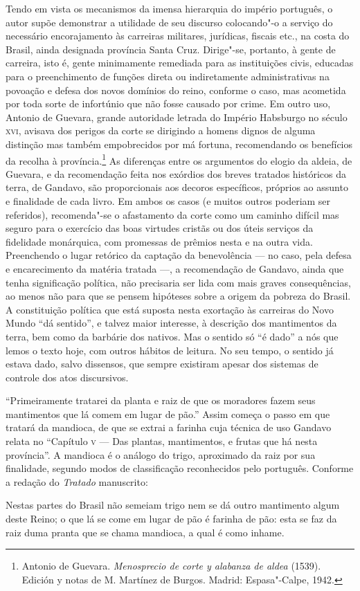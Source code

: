 Tendo em vista os mecanismos da imensa hierarquia do império português,
o autor supõe demonstrar a utilidade de seu discurso colocando"-o a
serviço do necessário encorajamento às carreiras militares, jurídicas,
fiscais etc., na costa do Brasil, ainda designada província Santa
Cruz. Dirige"-se, portanto, à gente de carreira, isto é, gente
minimamente remediada para as instituições civis, educadas para o
preenchimento de funções direta ou indiretamente administrativas na
povoação e defesa dos novos domínios do reino, conforme o caso, mas
acometida por toda sorte de infortúnio que não fosse causado por crime.
Em outro uso, Antonio de Guevara, grande autoridade letrada do Império
Habsburgo no século \textsc{xvi}, avisava dos perigos da corte se dirigindo a
homens dignos de alguma distinção mas também empobrecidos por má
fortuna, recomendando os benefícios da recolha à província.\footnote{ Antonio 
de Guevara. \textit{Menosprecio de corte y alabanza de aldea} (1539).
Edición y notas de M. Martínez de Burgos. Madrid: Espasa"-Calpe, 1942.}
As diferenças entre os argumentos do elogio da aldeia, de Guevara, e da
recomendação feita nos exórdios dos breves tratados históricos da
terra, de Gandavo, são proporcionais aos decoros específicos, próprios
ao assunto e finalidade de cada livro. Em ambos os casos (e muitos
outros poderiam ser referidos), recomenda"-se o afastamento da corte
como um caminho difícil mas seguro para o exercício das boas virtudes
cristãs ou dos úteis serviços da fidelidade monárquica, com promessas
de prêmios nesta e na outra vida. Preenchendo o lugar retórico da
captação da benevolência --- no caso, pela defesa  e encarecimento da
matéria tratada ---, a recomendação de Gandavo, ainda que tenha
significação política, não precisaria ser lida com mais graves
consequências, ao menos não para que se pensem hipóteses sobre a origem
da pobreza do Brasil. A constituição política que está suposta nesta
exortação às carreiras do Novo Mundo ``dá sentido'', e talvez maior interesse, 
à descrição dos mantimentos da terra, bem como da barbárie dos nativos. 
Mas o sentido só ``é dado'' a nós que lemos o texto hoje, com outros hábitos de leitura. 
No seu tempo, o sentido já estava dado, salvo dissensos, que sempre existiram 
apesar dos sistemas de controle dos atos discursivos. 

``Primeiramente tratarei da planta e raiz de que os
moradores fazem seus mantimentos que lá comem em lugar de
pão.'' Assim começa o passo em que tratará da mandioca, de
que se extrai a farinha cuja técnica de uso Gandavo relata no
``Capítulo \textsc{v} --- Das plantas, mantimentos, e frutas que há
nesta província''. A mandioca é o análogo do trigo,
aproximado da raiz por sua finalidade, segundo modos de classificação
reconhecidos pelo português. Conforme a redação do \textit{Tratado} manuscrito:
\begin{hedraquote}
Nestas partes do Brasil não semeiam trigo nem se dá outro mantimento algum
deste Reino; o que lá se come em lugar de pão é farinha de pão: esta
se faz da raiz duma pranta que se chama mandioca, a qual é como inhame.
\end{hedraquote}

